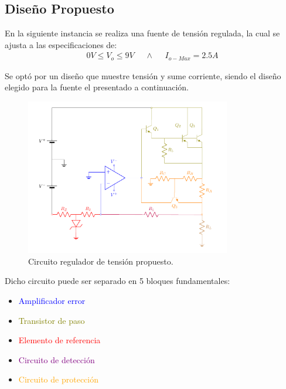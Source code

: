 



\tableofcontents
\newpage
\subsection{Diseño Propuesto}

En la siguiente instancia se realiza una fuente de tensión regulada, la cual se ajusta a las especificaciones de:
\begin{align}
0V \leq V_o \leq 9V \ \ \ \ \ \ \wedge \ \ \ \ \ \ I_{o-Max}=2.5A
\end{align}

Se optó por un diseño que muestre tensión y sume corriente, siendo el diseño elegido para la fuente el presentado a continuación.
\begin{figure}[H]
\centering
	\includegraphics[width=0.8\textwidth, page=1]{ImagenesEjercicio2/Regulador.pdf}
	\caption{Circuito regulador de tensión propuesto.}
	\label{fig:circuitoprop}
\end{figure}

Dicho circuito puede ser separado en 5 bloques fundamentales:
\begin{itemize}
\item \textcolor{blue}{Amplificador error}
\item \textcolor{olive}{Transistor de paso}
\item \textcolor{red}{Elemento de referencia}
\item \textcolor{purple}{Circuito de detección}
\item \textcolor{orange}{Circuito de protección}
\end{itemize}


